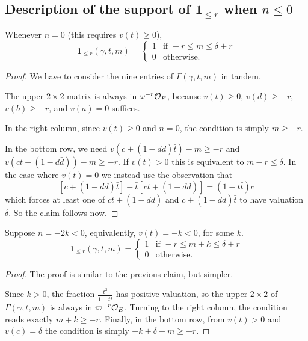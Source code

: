 \subsection{Description of the support of $\mathbf{1}_{\le r}$ when $n \le 0$}
\begin{claim}
  Whenever $n = 0$ (this requires $v(t) \geq 0$),
  \[
    \mathbf{1}_{\le r}(\gamma, t, m) =
    \begin{cases}
      1 & \text{if } -r \le m \le \delta+r \\
      0 & \text{otherwise.}
    \end{cases}
  \]
\end{claim}
\begin{proof}
  We have to consider the nine entries of $\Gamma(\gamma, t, m)$ in tandem.

  The upper $2 \times 2$ matrix is always in $\omega^{-r}\mathcal O_E$,
  because $v(t) \geq 0$, $v(d) \geq -r$, $v(b) \geq -r$, and $v(a) = 0$ suffices.

  In the right column, since $v(t) \geq 0$ and $n = 0$, the condition is simply $m \ge -r$.

  In the bottom row, we need
  $v\left( c+(1-d\bar d) \bar t \right)-m \geq -r$
  and $v\left( ct +(1-d\bar d) \right)-m \geq -r$.
  If $v(t) > 0$ this is equivalent to $m-r \leq \delta$.
  In the case where $v(t) = 0$ we instead use the observation that
  \begin{equation}
    \left[ c + (1-d \bar d) \bar t \right]
    - \bar t \left[ ct + (1-d \bar d) \right] = (1-t\bar t) c
    \label{eq:ctrick}
  \end{equation}
  which forces at least one of $ct + (1-d \bar d)$ and $c + (1-d \bar d) \bar t$ to
  have valuation $\delta$. So the claim follows now.
\end{proof}

\begin{claim}
  Suppose $n = -2k < 0$, equivalently, $v(t) = -k < 0$, for some $k$.
  \[
    \mathbf{1}_{\le r}(\gamma, t, m) =
    \begin{cases}
      1 & \text{if } -r \le m+k \le \delta+r \\
      0 & \text{otherwise.}
    \end{cases}
  \]
\end{claim}
\begin{proof}
  The proof is similar to the previous claim, but simpler.

  Since $k > 0$, the fraction $\frac{t^2}{1-t \bar t}$ has positive valuation,
  so the upper $2 \times 2$ of $\Gamma(\gamma, t, m)$ is always in $\varpi^{-r}\mathcal O_E$.
  Turning to the right column, the condition reads exactly $m+k \geq -r$.
  Finally, in the bottom row, from $v(t) > 0$ and $v(c) = \delta$
  the condition is simply $-k+\delta-m \geq -r$.
\end{proof}

